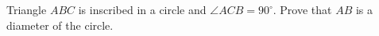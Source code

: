 Triangle $ABC$ is inscribed in a circle and $\angle ACB=90^\circ$. Prove that $AB$ is a diameter of the circle.
